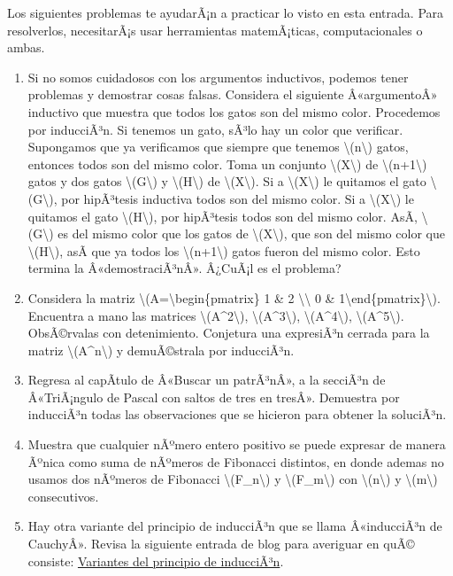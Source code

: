 Los siguientes problemas te ayudarÃ¡n a practicar lo visto en esta
entrada. Para resolverlos, necesitarÃ¡s usar herramientas matemÃ¡ticas,
computacionales o ambas.

\begin{enumerate}
\item
  Si no somos cuidadosos con los argumentos inductivos, podemos tener
  problemas y demostrar cosas falsas. Considera el siguiente
  Â«argumentoÂ» inductivo que muestra que todos los gatos son del mismo
  color. Procedemos por inducciÃ³n. Si tenemos un gato, sÃ³lo hay un
  color que verificar. Supongamos que ya verificamos que siempre que
  tenemos {\textbackslash(n\textbackslash)} gatos, entonces todos son
  del mismo color. Toma un conjunto {\textbackslash(X\textbackslash)} de
  {\textbackslash(n+1\textbackslash)} gatos y dos gatos
  {\textbackslash(G\textbackslash)} y {\textbackslash(H\textbackslash)}
  de {\textbackslash(X\textbackslash)}. Si a
  {\textbackslash(X\textbackslash)} le quitamos el gato
  {\textbackslash(G\textbackslash)}, por hipÃ³tesis inductiva todos son
  del mismo color. Si a {\textbackslash(X\textbackslash)} le quitamos el
  gato {\textbackslash(H\textbackslash)}, por hipÃ³tesis todos son del
  mismo color. AsÃ­, {\textbackslash(G\textbackslash)} es del mismo color
  que los gatos de {\textbackslash(X\textbackslash)}, que son del mismo
  color que {\textbackslash(H\textbackslash)}, asÃ­ que ya todos los
  {\textbackslash(n+1\textbackslash)} gatos fueron del mismo color. Esto
  termina la Â«demostraciÃ³nÂ». Â¿CuÃ¡l es el problema?
\item
  Considera la matriz {\textbackslash(A=\textbackslash begin\{pmatrix\}
  1 \& 2 \textbackslash\textbackslash{} 0 \&
  1\textbackslash end\{pmatrix\}\textbackslash)}. Encuentra a mano las
  matrices {\textbackslash(A\^{}2\textbackslash)},
  {\textbackslash(A\^{}3\textbackslash)},
  {\textbackslash(A\^{}4\textbackslash)},
  {\textbackslash(A\^{}5\textbackslash)}. ObsÃ©rvalas con detenimiento.
  Conjetura una expresiÃ³n cerrada para la matriz
  {\textbackslash(A\^{}n\textbackslash)} y demuÃ©strala por inducciÃ³n.
\item
  Regresa al capÃ­tulo de Â«Buscar un patrÃ³nÂ», a la secciÃ³n de
  Â«TriÃ¡ngulo de Pascal con saltos de tres en tresÂ». Demuestra por
  inducciÃ³n todas las observaciones que se hicieron para obtener la
  soluciÃ³n.
\item
  Muestra que cualquier nÃºmero entero positivo se puede expresar de
  manera Ãºnica como suma de nÃºmeros de Fibonacci distintos, en donde
  ademas no usamos dos nÃºmeros de Fibonacci
  {\textbackslash(F\_n\textbackslash)} y
  {\textbackslash(F\_m\textbackslash)} con
  {\textbackslash(n\textbackslash)} y {\textbackslash(m\textbackslash)}
  consecutivos.
\item
  Hay otra variante del principio de inducciÃ³n que se llama
  Â«inducciÃ³n de CauchyÂ». Revisa la siguiente entrada de blog para
  averiguar en quÃ© consiste:
  \href{https://blog.nekomath.com/seminario-de-resolucion-de-problemas-principio-de-induccion-parte-3/}{Variantes
  del principio de inducciÃ³n}.
\end{enumerate}

